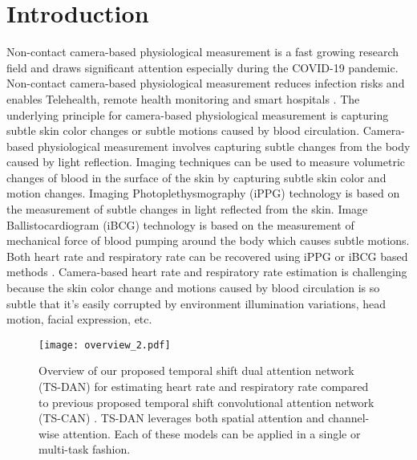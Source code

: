 \documentclass[conference]{IEEEtran}
\begin{document}
\section{Introduction}
Non-contact camera-based physiological measurement is a fast growing research field and draws significant attention especially during the COVID-19 pandemic. Non-contact camera-based physiological measurement reduces infection risks and enables Telehealth, remote health monitoring and smart hospitals \cite{smart-hospital}. The underlying principle for camera-based physiological measurement is capturing subtle skin color changes \cite{wu2012eulerian} or subtle motions \cite{balakrishnan2013detecting} caused by blood circulation. Camera-based physiological measurement involves capturing subtle changes from the body caused by light reflection. Imaging techniques can be used to measure volumetric changes of blood in the surface of the skin by capturing subtle skin color and motion changes. Imaging Photoplethysmography (iPPG) technology is based on the measurement of subtle changes in light reflected from the skin. Image Ballistocardiogram (iBCG) technology is based on the measurement of mechanical force of blood pumping around the body which causes subtle motions. Both heart rate and respiratory rate can be recovered using iPPG or iBCG based methods \cite{bartula2013camera, chen2018deepphys, janssen2015video, wang2015novel}. Camera-based heart rate and respiratory rate estimation is challenging because the skin color change and motions caused by blood circulation is so subtle that it's easily corrupted by environment illumination variations, head motion, facial expression, etc. 
\begin{figure}[htbp]
\texttt{[image: overview\_2.pdf]}
\caption{Overview of our proposed temporal shift dual attention network (TS-DAN) for estimating heart rate and respiratory rate compared to previous proposed temporal shift convolutional attention network (TS-CAN) \cite{liu2020multi}. TS-DAN leverages both spatial attention and channel-wise attention. Each of these models can be applied in a single or multi-task fashion.}
\label{flow}
\end{figure}
\end{document}
